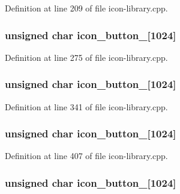 Definition at line 209 of file icon-\/library.cpp.

\hypertarget{icon-library_8cpp_a128009fa1268efbbd29245c5b3525fc0}{
\subsubsection[{icon\_\-button\_\-2}]{\setlength{\rightskip}{0pt plus 5cm}unsigned char {\bf icon\_\-button\_}\mbox{[}1024\mbox{]}}}
\label{icon-library_8cpp_a128009fa1268efbbd29245c5b3525fc0}


Definition at line 275 of file icon-\/library.cpp.

\hypertarget{icon-library_8cpp_abb96ff6b8c14e99a0c7ca43474fbb72a}{
\subsubsection[{icon\_\-button\_\-3}]{\setlength{\rightskip}{0pt plus 5cm}unsigned char {\bf icon\_\-button\_}\mbox{[}1024\mbox{]}}}
\label{icon-library_8cpp_abb96ff6b8c14e99a0c7ca43474fbb72a}


Definition at line 341 of file icon-\/library.cpp.

\hypertarget{icon-library_8cpp_a3fe30debc331f148c02f9716be8a3266}{
\subsubsection[{icon\_\-button\_\-4}]{\setlength{\rightskip}{0pt plus 5cm}unsigned char {\bf icon\_\-button\_}\mbox{[}1024\mbox{]}}}
\label{icon-library_8cpp_a3fe30debc331f148c02f9716be8a3266}


Definition at line 407 of file icon-\/library.cpp.

\hypertarget{icon-library_8cpp_a5867e4d91ba53e3e0071382a084349fa}{
\subsubsection[{icon\_\-button\_\-5}]{\setlength{\rightskip}{0pt plus 5cm}unsigned char {\bf icon\_\-button\_}\mbox{[}1024\mbox{]}}}
\label{icon-library_8cpp_a5867e4d91ba53e3e0071382a084349fa}


